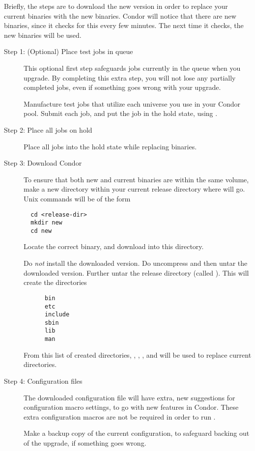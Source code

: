 \begin{description}
Briefly, the steps are to download the new version in
order to replace your current binaries with the new binaries.
Condor will notice that there are new binaries, since
it checks for this every few minutes.
The next time it checks, the new binaries will be used.

\begin{description}
\item[Step 1:  (Optional) Place test jobs in queue]
This optional first step safeguards jobs currently in the
queue when you upgrade.
By completing this extra step, you will not lose any
partially completed jobs, even if something goes wrong with
your upgrade.

Manufacture test jobs that utilize each universe you use in
your Condor pool.
Submit each job, and put the job in the hold state, 
using .

\item[Step 2:  Place all jobs on hold]
Place all jobs into the hold state while replacing binaries.


\item[Step 3:  Download Condor \VersionNotice]
To ensure that both new and current binaries are within
the same volume,
make a new directory within your current release
directory where \VersionNotice 
will go. 
Unix commands will be of the form
\begin{verbatim}
  cd <release-dir>
  mkdir new
  cd new
\end{verbatim}

Locate the correct \VersionNotice
binary, and download into this  directory.

Do \emph{not} install the downloaded version.
Do uncompress and then untar the downloaded version.
Further untar the release directory (called ).
This will create the directories
\begin{verbatim}
      bin
      etc
      include
      sbin
      lib
      man
\end{verbatim}
From this list of created directories, 
,
,
, and
 will be used to replace current directories.

\item[Step 4:  Configuration files]
The downloaded \VersionNotice
configuration file will have extra, new suggestions
for configuration macro settings,
to go with new features in Condor.
These extra configuration macros
are not be required in order to run \VersionNotice.

Make a backup copy of the current configuration, to
safeguard backing out of the upgrade, if something goes wrong.


\end{description}
\end{description}
